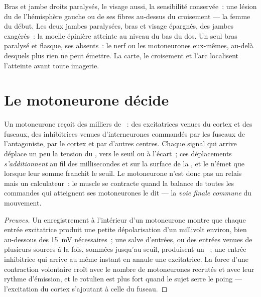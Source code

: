 \begin{example}\label{ex:g12:brain-and-movement:paralysis}
Bras et jambe droits paralysés, le visage aussi, la sensibilité
conservée~: une lésion du  de l'hémisphère gauche ou de
ses fibres au-dessus du croisement --- la femme du début. Les deux
jambes paralysées, bras et visage épargnés,  des jambes
exagérés~: la moelle épinière atteinte au niveau du bas du dos. Un
seul bras paralysé et flasque, ses  absents~: le nerf ou les
motoneurones eux-mêmes, au-delà desquels plus rien ne peut émettre. La
carte, le croisement et l'arc localisent l'atteinte avant toute
imagerie.
\end{example}

\section{Le motoneurone décide}

\begin{proposition}\label{prop:g12:brain-and-movement:integration}
Un motoneurone reçoit des milliers de ~: des 
excitatrices venues du cortex et des fuseaux, des 
inhibitrices venues d'interneurones commandés par les fuseaux de
l'antagoniste, par le cortex et par d'autres centres. Chaque signal
qui arrive déplace un peu la tension du , vers le seuil ou à
l'écart~; ces déplacements \emph{s'additionnent} au fil des
millisecondes et sur la surface de la , et le  n'émet
que lorsque leur somme franchit le seuil. Le motoneurone n'est donc
pas un relais mais un calculateur~: le muscle se contracte quand la
balance de toutes les commandes qui atteignent ses motoneurones le
dit --- la \emph{voie finale commune} du
mouvement.
\end{proposition}
\begin{proof}[Preuves]
Un enregistrement à l'intérieur d'un motoneurone montre que chaque
entrée excitatrice produit une petite dépolarisation d'un millivolt
environ, bien au-dessous des \qty{15}{mV} nécessaires~; une salve
d'entrées, ou des entrées venues de plusieurs sources à la fois,
sommées jusqu'au seuil, produisent un ~; une entrée
inhibitrice qui arrive au même instant en annule une excitatrice. La
force d'une contraction volontaire croît avec le nombre de
motoneurones recrutés et avec leur rythme d'émission, et le 
rotulien est plus fort quand le sujet serre le poing --- l'excitation
du cortex s'ajoutant à celle du fuseau.
\end{proof}

